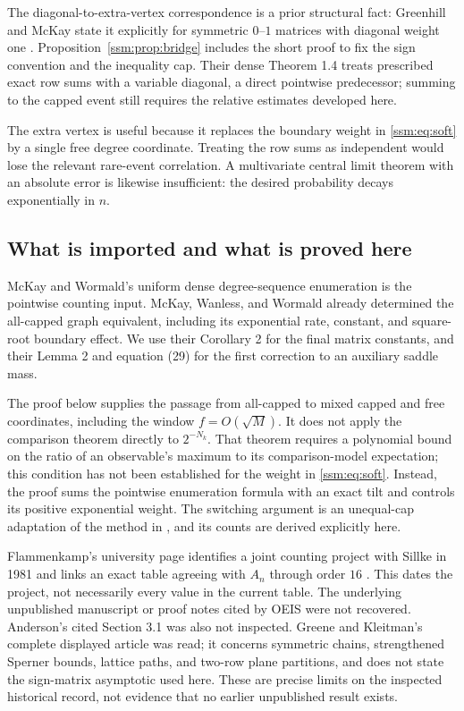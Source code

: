 The diagonal-to-extra-vertex correspondence is a prior structural fact: Greenhill and McKay state it explicitly for symmetric $0$--$1$ matrices with diagonal weight one \cite[p.~902; preprint p.~3]{gm}. Proposition~\ref{ssm:prop:bridge} includes the short proof to fix the sign convention and the inequality cap. Their dense Theorem 1.4 treats prescribed exact row sums with a variable diagonal, a direct pointwise predecessor; summing to the capped event still requires the relative estimates developed here.

The extra vertex is useful because it replaces the boundary weight in \eqref{ssm:eq:soft} by a single free degree coordinate. Treating the row sums as independent would lose the relevant rare-event correlation. A multivariate central limit theorem with an absolute error is likewise insufficient: the desired probability decays exponentially in $n$.

\subsection{What is imported and what is proved here}
McKay and Wormald's uniform dense degree-sequence enumeration \cite[Theorem 3(ii)]{mw} is the pointwise counting input. McKay, Wanless, and Wormald \cite{mww} already determined the all-capped graph equivalent, including its exponential rate, constant, and square-root boundary effect. We use their Corollary 2 for the final matrix constants, and their Lemma 2 and equation (29) for the first correction to an auxiliary saddle mass.

The proof below supplies the passage from all-capped to mixed capped and free coordinates, including the window $f=O(\sqrt M)$. It does not apply the comparison theorem \cite[Theorem 3]{mww} directly to $2^{-N_k}$. That theorem requires a polynomial bound on the ratio of an observable's maximum to its comparison-model expectation; this condition has not been established for the weight in \eqref{ssm:eq:soft}. Instead, the proof sums the pointwise enumeration formula with an exact tilt and controls its positive exponential weight. The switching argument is an unequal-cap adaptation of the method in \cite[Lemma 4]{mww}, and its counts are derived explicitly here.

Flammenkamp's university page identifies a joint counting project with Sillke in 1981 and links an exact table agreeing with $A_n$ through order $16$ \cite{sf}. This dates the project, not necessarily every value in the current table. The underlying unpublished manuscript or proof notes cited by OEIS were not recovered. Anderson's cited Section 3.1 \cite{anderson} was also not inspected. Greene and Kleitman's complete displayed article \cite{gk} was read; it concerns symmetric chains, strengthened Sperner bounds, lattice paths, and two-row plane partitions, and does not state the sign-matrix asymptotic used here. These are precise limits on the inspected historical record, not evidence that no earlier unpublished result exists.

